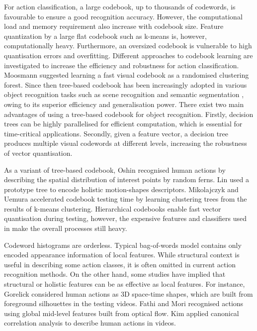 For action classification, a large codebook, \eg up to thousands of codewords, is favourable to ensure a good recognition accuracy. However, the computational load and memory requirement also increase with codebook size. Feature quantization by a large flat codebook such as k-means is, however, computationally heavy. Furthermore, an oversized codebook is vulnerable to high quantisation errors and overfitting. Different approaches to codebook learning are investigated to increase the efficiency and robustness for action classification. 
Moosmann \etal \cite{Moosmann2007} suggested learning a fast visual codebook as a randomised clustering forest. Since then tree-based codebook has been increasingly adopted in various object recognition tasks such as scene recognition \cite{Bosch2007} and semantic segmentation \cite{Shotton2008}, owing to its superior efficiency and generalisation power.
There exist two main advantages of using a tree-based codebook for object recognition. 
Firstly, decision trees can be highly parallelised for efficient computation, which is essential for time-critical applications. Secondly, given a feature vector, a decision tree produces multiple visual codewords at different levels, increasing the robustness of vector quantisation. 

As a variant of tree-based codebook, Oshin \etal \cite{Oshin2009} recognised human actions by describing the spatial distribution of interest points by random ferns.  
Lin \etal \cite{Lin2009} used a prototype tree to encode holistic motion-shapes descriptors. 
Mikolajczyk and Uemura \cite{Mikolajczyk2008} accelerated codebook testing time by learning clustering trees from the results of k-means clustering. 
Hierarchical codebooks enable fast vector quantisation during testing, however, the expensive features and classifiers used in \cite{Lin2009, Mikolajczyk2008} make the overall processes still heavy.

Codeword histograms are orderless. Typical bag-of-words model contains only encoded appearance information of local features.  
While structural context is useful in describing some action classes, it is often omitted in current action recognition methods.
On the other hand, some studies have implied that structural or holistic features can be as effective as local features. 
For instance, Gorelick \etal \cite{Gorelick2007} considered human actions as 3D space-time shapes, which are built from foreground silhouettes in the testing videos. Fathi and Mori \cite{Fathi2008} recognised actions using global mid-level features built from optical flow. Kim \etal \cite{Kim2007} applied canonical correlation analysis to describe human actions in videos.    

